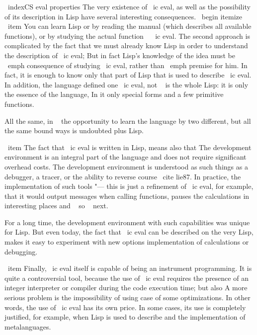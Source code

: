 \ indexCS {eval} {properties}
The very existence of \ ic {eval}, as well as the possibility of its description in Lisp
have several interesting consequences.
\ begin {itemize}
  \ item You can learn Lisp or by reading the manual (which describes
        all available functions), or by studying the actual function ~ \ ic {eval}.
        The second approach is complicated by the fact that we must already know Lisp in order to
        understand the description of \ ic {eval}; But in fact Lisp's knowledge of the idea must be
        \ emph {consequence} of studying \ ic {eval}, rather than \ emph {premise} for
        him. In fact, it is enough to know only that part of Lisp that
        is used to describe \ ic {eval}. In addition, the language defined
        one \ ic {eval}, not ~ is the whole Lisp: it is only the essence of the language,
        In it only special forms and a few primitive
        functions.

        All the same, in ~ the opportunity to learn the language by two different, but all the same
        bound ways is undoubted plus Lisp.

  \ item The fact that \ ic {eval} is written in Lisp, means also that
        The development environment is an integral part of the language and does not require
        significant overhead costs. The development environment is understood as
        such things as a debugger, a tracer, or the ability to reverse
        course \ cite {lie87}. In practice, the implementation of such tools "---
        this is just a refinement of \ ic {eval}, for example, that it would output
        messages when calling functions, pauses the calculations
        in ~ interesting places and ~ so ~ next.

        For a long time, the development environment with such capabilities was unique
        for Lisp. But even today, the fact that \ ic {eval} can be described on the very
        Lisp, makes it easy to experiment with new options
        implementation of calculations or debugging.

  \ item Finally, \ ic {eval} itself is capable of being an instrument
        programming. It is quite a controversial tool, because
        the use of \ ic {eval} requires the presence of an integer
        interpreter or compiler during the code execution time; but also
        A more serious problem is the impossibility of using
        case of some optimizations. In other words, the use of
        \ ic {eval} has its own price. In some cases, its use
        is completely justified, for example, when Lisp is used to describe
        and the implementation of metalanguages.

